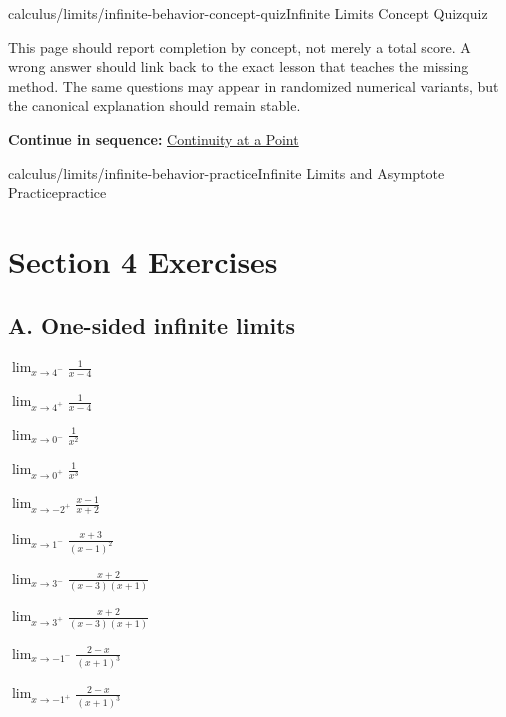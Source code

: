 \documentclass[11pt,openany]{book}
\theoremstyle{bgplain}
\newcommand{\webnext}[2]{%
  \par\addvspace{1.2em}\noindent{\color{BGLine}\rule{\textwidth}{0.35pt}}\par\smallskip
  {\small\color{BGGray}\textbf{Continue in sequence:} \hyperlink{web:#1}{#2}}\par
}
\begin{document}
\begin{webpage}{calculus/limits/infinite-behavior-concept-quiz}{Infinite Limits Concept Quiz}{quiz}
\begin{bgsummary}[title={Quiz use on the website}]
This page should report completion by concept, not merely a total score. A wrong answer should link back to the exact lesson that teaches the missing method. The same questions may appear in randomized numerical variants, but the canonical explanation should remain stable.
\end{bgsummary}
\webnext{calculus/continuity/continuity-at-a-point}{Continuity at a Point}
\end{webpage}

\begin{webpage}{calculus/limits/infinite-behavior-practice}{Infinite Limits and Asymptote Practice}{practice}
\section*{Section 4 Exercises}

\subsection*{A. One-sided infinite limits}
\begin{bgexercises}[label=\textbf{4.\arabic*}]
  \item \(\displaystyle\lim_{x\to4^-}\frac1{x-4}\)
  \item \(\displaystyle\lim_{x\to4^+}\frac1{x-4}\)
  \item \(\displaystyle\lim_{x\to0^-}\frac1{x^2}\)
  \item \(\displaystyle\lim_{x\to0^+}\frac1{x^3}\)
  \item \(\displaystyle\lim_{x\to-2^+}\frac{x-1}{x+2}\)
  \item \(\displaystyle\lim_{x\to1^-}\frac{x+3}{(x-1)^2}\)
  \item \(\displaystyle\lim_{x\to3^-}\frac{x+2}{(x-3)(x+1)}\)
  \item \(\displaystyle\lim_{x\to3^+}\frac{x+2}{(x-3)(x+1)}\)
  \item \(\displaystyle\lim_{x\to-1^-}\frac{2-x}{(x+1)^3}\)
  \item \(\displaystyle\lim_{x\to-1^+}\frac{2-x}{(x+1)^3}\)
\end{bgexercises}


\end{webpage}
\end{document}
